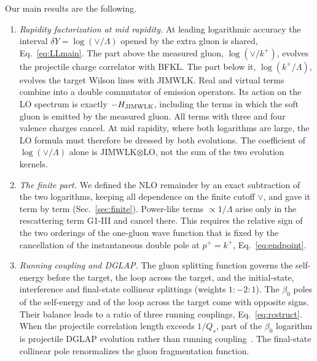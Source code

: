 \documentclass[aps,prd,onecolumn,superscriptaddress,nofootinbib,floatfix,longbibliography,11pt]{revtex4-2}
\numberwithin{equation}{section}
\begin{document}
Our main results are the following.
\begin{enumerate}
\item \emph{Rapidity factorization at mid rapidity.} At leading logarithmic accuracy the interval $\delta Y=\log(\vee/\Lambda)$ opened by the extra gluon is shared, Eq.~\eqref{eq:LLmain}. The part above the measured gluon, $\log(\vee/k^+)$, evolves the projectile charge correlator with BFKL. The part below it, $\log(k^+/\Lambda)$, evolves the target Wilson lines with JIMWLK. Real and virtual terms combine into a double commutator of emission operators. Its action on the LO spectrum is exactly $-H_{\rm JIMWLK}$, including the terms in which the soft gluon is emitted by the measured gluon. All terms with three and four valence charges cancel. At mid rapidity, where both logarithms are large, the LO formula must therefore be dressed by both evolutions. The coefficient of $\log(\vee/\Lambda)$ alone is JIMWLK$\otimes$LO, not the sum of the two evolution kernels.
\item \emph{The finite part.} We defined the NLO remainder by an exact subtraction of the two logarithms, keeping all dependence on the finite cutoff $\vee$, and gave it term by term (Sec.~\ref{sec:finite}). Power-like terms $\propto1/\Lambda$ arise only in the rescattering term G1-III and cancel there. This requires the relative sign of the two orderings of the one-gluon wave function that is fixed by the cancellation of the instantaneous double pole at $p^+=k^+$, Eq.~\eqref{eq:endpoint}.
\item \emph{Running coupling and DGLAP.} The gluon splitting function governs the self-energy before the target, the loop across the target, and the initial-state, interference and final-state collinear splittings (weights $1:-2:1$). The $\beta_0$ poles of the self-energy and of the loop across the target come with opposite signs. Their balance leads to a ratio of three running couplings, Eq.~\eqref{eq:rcstruct}. When the projectile correlation length exceeds $1/Q_s$, part of the $\beta_0$ logarithm is projectile DGLAP evolution rather than running coupling~\cite{Kovner:2023vsy}. The final-state collinear pole renormalizes the gluon fragmentation function.
\end{enumerate}
\end{document}

